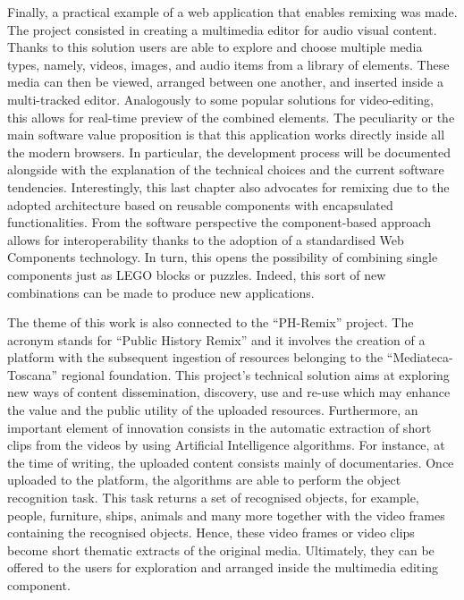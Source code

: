 Finally, a practical example of a web application that enables remixing was made. The project consisted in creating a multimedia editor for audio visual content. Thanks to this solution users are able to explore and choose multiple media types, namely, videos, images, and audio items from a library of elements. These media can then be viewed, arranged between one another, and inserted inside a multi-tracked editor. Analogously to some popular solutions for video-editing, this allows for real-time preview of the combined elements. The peculiarity or the main software value proposition is that this application works directly inside all the modern browsers.
In particular, the development process will be documented alongside with the explanation of the technical choices and the current software tendencies. Interestingly, this last chapter also advocates for remixing due to the adopted architecture based on reusable components with encapsulated functionalities. From the software perspective the component-based approach allows for interoperability thanks to the adoption of a standardised Web Components technology. In turn, this opens the possibility of combining single components just as LEGO blocks or puzzles. Indeed, this sort of new combinations can be made to produce new applications.

The theme of this work is also connected to the “PH-Remix” project. The acronym stands for “Public History Remix” and it involves the creation of a platform with the subsequent ingestion of resources belonging to the “Mediateca-Toscana” regional foundation. This project’s technical solution aims at exploring new ways of content dissemination, discovery, use and re-use which may enhance the value and the public utility of the uploaded resources. Furthermore, an important element of innovation consists in the automatic extraction of short clips from the videos by using Artificial Intelligence algorithms. For instance, at the time of writing, the uploaded content consists mainly of documentaries. Once uploaded to the platform, the algorithms are able to perform the object recognition task. This task returns a set of recognised objects, for example, people, furniture, ships, animals and many more together with the video frames containing the recognised objects. Hence, these video frames or video clips become short thematic extracts of the original media. Ultimately, they can be offered to the users for exploration and arranged inside the multimedia editing component.

